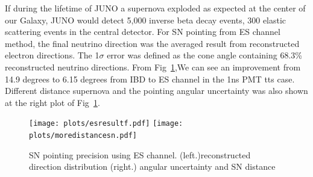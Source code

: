 \documentclass[a4paper,10pt]{cpc-hepnp}
\begin{document}
If during the lifetime of JUNO a supernova exploded as expected at the center of
    our Galaxy, JUNO would detect 5,000 inverse beta decay
    events, 300 elastic scattering events in the central detector.
For SN pointing from ES channel method, the final neutrino direction was the
averaged result from reconstructed electron directions.
The 1$\sigma$ error was defined as the cone angle containing 68.3\%
reconstructed neutrino directions. From Fig~\ref{sn_dir},We can see an improvement from 14.9 degrees to
6.15 degrees from IBD to ES channel in the 1ns PMT tts case. Different distance
supernova and the pointing angular uncertainty was also shown at the right plot
of Fig~\ref{sn_dir}.
\begin{figure}[htbp]
\centering %
\texttt{[image: plots/esresultf.pdf]}
\hfill
\texttt{[image: plots/moredistancesn.pdf]}
\caption{\label{sn_dir} SN pointing precision using ES channel.
(left.)reconstructed direction distribution (right.) angular uncertainty and SN
distance}
\end{figure}
\end{document}
